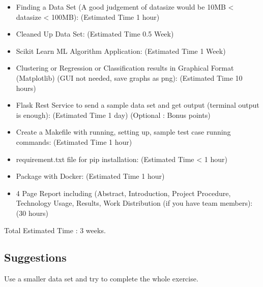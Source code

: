 \begin{itemize}
\item Finding a Data Set (A good judgement of datasize would be 10MB < datasize < 100MB): (Estimated Time 1 hour)
\item Cleaned Up Data Set: (Estimated Time 0.5 Week)
\item Scikit Learn ML Algorithm Application: (Estimated Time 1 Week)
\item Clustering or Regression or Classification results in Graphical
  Format (Matplotlib) (GUI not needed, save graphs as png): (Estimated
  Time 10 hours)
\item Flask  Rest Service  to send  a sample data  set and  get output
  (terminal output is enough): (Estimated Time 1 day) (Optional : Bonus
  points)
\item Create a Makefile with running, setting up, sample test case
  running commands: (Estimated Time 1 hour)
\item requirement.txt file for pip installation: (Estimated Time < 1 hour)
\item Package with Docker: (Estimated Time 1 hour)
\item 4 Page Report including (Abstract, Introduction, Project
  Procedure, Technology Usage, Results, Work Distribution (if you have
  team members): (30 hours)
\end{itemize}

Total Estimated Time : 3 weeks.
\subsection{Suggestions}

Use a smaller data set and try to complete the whole exercise. 

